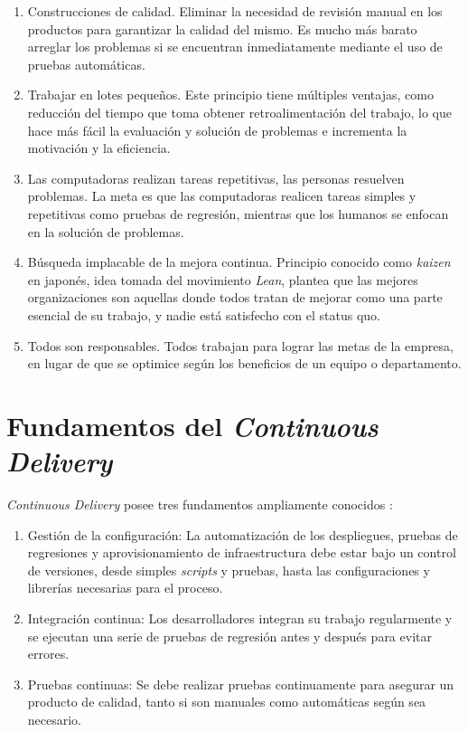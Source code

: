 \begin{enumerate}
    \item Construcciones de calidad. Eliminar la necesidad de revisión manual en los productos para garantizar la calidad del mismo. Es mucho más barato arreglar los problemas si se encuentran inmediatamente mediante el uso de pruebas automáticas.

    \item Trabajar en lotes pequeños. Este principio tiene múltiples ventajas, como reducción del tiempo que toma obtener retroalimentación del trabajo, lo que hace más fácil la evaluación y solución de problemas e incrementa la motivación y la eficiencia.

    \item Las computadoras realizan tareas repetitivas, las personas resuelven problemas. La meta es que las computadoras realicen tareas simples y repetitivas como pruebas de regresión, mientras que los humanos se enfocan en la solución de problemas.

    \item Búsqueda implacable de la mejora continua. Principio conocido como \textit{kaizen} en japonés, idea tomada del movimiento \textit{Lean}, plantea que las mejores organizaciones son aquellas donde todos tratan de mejorar como una parte esencial de su trabajo, y nadie está satisfecho con el status quo.

    \item Todos son responsables. Todos trabajan para lograr las metas de la empresa, en lugar de que se optimice según los beneficios de un equipo o departamento.

\end{enumerate}

\section{Fundamentos del \textit{Continuous Delivery}}

\textit{Continuous Delivery} posee tres fundamentos ampliamente conocidos \cite{cdfoundations}:

\begin{enumerate}

    \item Gestión de la configuración: La automatización de los despliegues, pruebas de regresiones y aprovisionamiento de infraestructura debe estar bajo un control de versiones, desde simples \textit{scripts} y pruebas, hasta las configuraciones y librerías necesarias para el proceso.

    \item Integración continua: Los desarrolladores integran su trabajo regularmente y se ejecutan una serie de pruebas de regresión antes y después para evitar errores.

    \item Pruebas continuas: Se debe realizar pruebas continuamente para asegurar un producto de calidad, tanto si son manuales como automáticas según sea necesario.

\end{enumerate}

